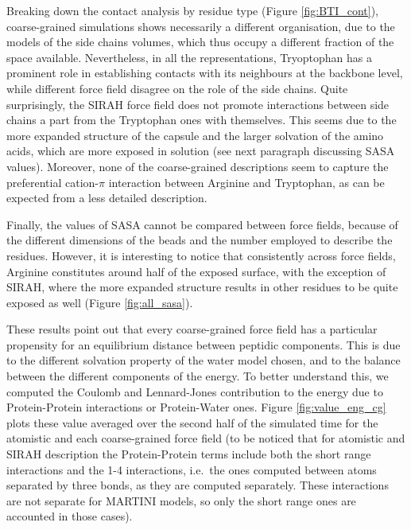 Breaking down the contact analysis by residue type (Figure \ref{fig:BTI_cont}), coarse-grained simulations shows necessarily a different organisation, due to the models of the side chains volumes, which thus occupy a different fraction of the space available.
%
Nevertheless, in all the representations, Tryoptophan has a prominent role in establishing contacts with its neighbours at the backbone level, while different force field disagree on the role of the side chains. Quite surprisingly, the SIRAH force field does not promote interactions between side chains a part from the Tryptophan ones with themselves. This seems due to the more expanded structure of the capsule and the larger solvation of the amino acids, which are more exposed in solution (see next paragraph discussing SASA values).
%
Moreover, none of the coarse-grained descriptions seem to capture the preferential cation-$\pi$ interaction between Arginine and Tryptophan, as can be expected from a less detailed description.

Finally, the values of SASA cannot be compared between force fields, because of the different dimensions of the beads and the number employed to describe the residues. However, it is interesting to notice that consistently across force fields, Arginine constitutes around half of the exposed surface, with the exception of SIRAH, where the more expanded structure results in other residues to be quite exposed as well (Figure \ref{fig:all_sasa}).

These results point out that every coarse-grained force field has a particular propensity for an equilibrium distance between peptidic components. This is due to the different solvation property of the water model chosen, and to the balance between the different components of the energy. To better understand this, we computed the Coulomb and Lennard-Jones contribution to the energy due to Protein-Protein interactions or Protein-Water ones.
%
Figure \ref{fig:value_eng_cg} plots these value averaged over the second half of the simulated time for the atomistic and each coarse-grained force field (to be noticed that for atomistic and SIRAH description the Protein-Protein terms include both the short range interactions and the 1-4 interactions, i.e.\ the ones computed between atoms separated by three bonds, as they are computed separately. These interactions are not separate for MARTINI models, so only the short range ones are accounted in those cases).

